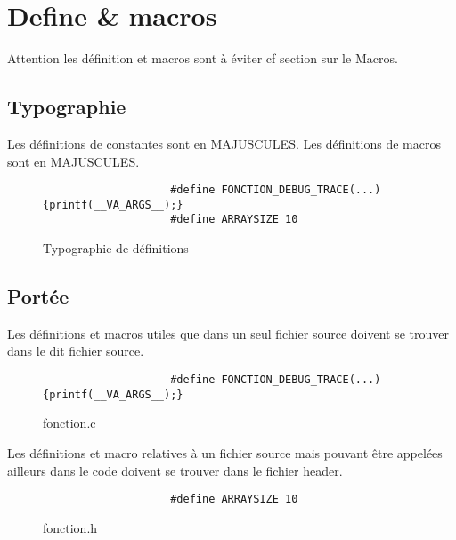 	\section{Define \& macros}
		Attention les définition et macros sont à éviter cf section sur le Macros.

		\subsection{Typographie}
			Les définitions de constantes sont en MAJUSCULES. Les définitions de macros sont en MAJUSCULES.

			\begin{figure}[H]
				\begin{changemargin}{-2.5cm}{-2.5cm}
				\begin{tcolorbox}
				\begin{verbatim}
					#define FONCTION_DEBUG_TRACE(...) {printf(__VA_ARGS__);}
					#define ARRAYSIZE 10
				\end{verbatim}
				\end{tcolorbox}
				\end{changemargin}
				\caption{Typographie de définitions}
			\end{figure}

		\subsection{Portée}
			Les définitions et macros utiles que dans un seul fichier source doivent se trouver dans le dit fichier source.

			\begin{figure}[H]
				\begin{changemargin}{-2.5cm}{-2.5cm}
				\begin{tcolorbox}
				\begin{verbatim}
					#define FONCTION_DEBUG_TRACE(...) {printf(__VA_ARGS__);}
				\end{verbatim}
				\end{tcolorbox}
				\end{changemargin}
				\caption{fonction.c}
			\end{figure}

			Les définitions et macro relatives à un fichier source mais pouvant être appelées ailleurs dans le code doivent se trouver dans le fichier header.

			\begin{figure}[H]
				\begin{changemargin}{-2.5cm}{-2.5cm}
				\begin{tcolorbox}
				\begin{verbatim}
					#define ARRAYSIZE 10
				\end{verbatim}
				\end{tcolorbox}
				\end{changemargin}
				\caption{fonction.h}
			\end{figure}

